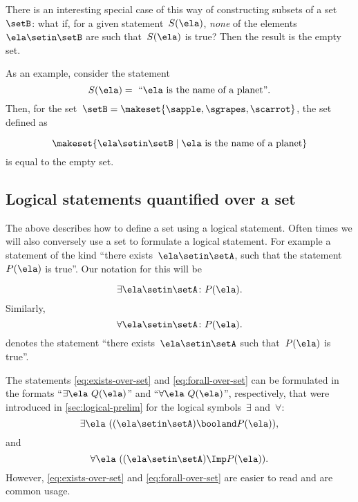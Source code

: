There is an interesting special case of this way of constructing subsets of a set~$\setB$:
what if, for a given statement~$S(\ela)$, \emph{none} of the elements~$\ela \setin\setB$ are such that~$S(\ela)$ is true?
Then the result is the empty set.

As an example, consider the statement
%
\begin{equation*}
    S(\ela) =\text{ ``} \ela \text{ is the name of a planet''}.
\end{equation*}
%
Then, for the set~$\setB = \makeset{ \sapple, \sgrapes, \scarrot }$, the set defined as

\begin{equation*}
    \makeset{ \ela \setin\setB \mid \ela \text{ is the name of a planet} }
\end{equation*}
is equal to the empty set.

\subsection{Logical statements quantified over a set}

The above describes how to define a set using a logical statement.
Often times we will also conversely use a set to formulate a logical statement.
For example a statement of the kind ``there exists~$\ela \setin \setA$, such that the statement~$P(\ela)$ is true''.
Our notation for this will be

\begin{equation}
    \label{eq:exists-over-set}
    \exists \ela \setin \setA \colon P(\ela).
\end{equation}
%
Similarly,
\begin{equation}
    \label{eq:forall-over-set}
    \forall \ela \setin \setA \colon P(\ela).
\end{equation}
denotes the statement ``there exists~$\ela \setin \setA$ such that~$P(\ela)$ is true''.

\begin{remark}
    The statements \cref{eq:exists-over-set} and \cref{eq:forall-over-set} can be formulated in the formats ``$\exists \ela \ Q(\ela)$'' and ``$\forall \ela \ Q(\ela)$'', respectively, that were introduced in \cref{sec:logical-prelim} for the logical symbols~$\exists$ and~$\forall$:
    \begin{equation*}
        \exists \ela \  ((\ela \setin \setA) \booland P(\ela)),
    \end{equation*}
    and
    \begin{equation*}
        \forall \ela\  ((\ela\setin \setA) \Imp P(\ela)).
    \end{equation*}
    However, \cref{eq:exists-over-set} and \cref{eq:forall-over-set} are easier to read and are common usage.
\end{remark}

